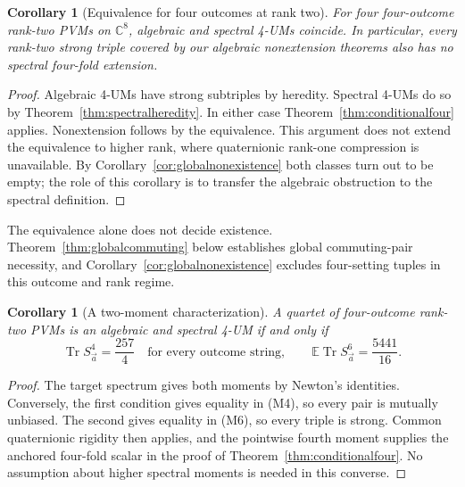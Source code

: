 \documentclass[11pt]{article}
\newtheorem{corollary}[theorem]{Corollary}
\begin{document}
\begin{corollary}[Equivalence for four outcomes at rank two]
\label{cor:unconditionalfour}
For four four-outcome rank-two PVMs on $\mathbb C^8$, algebraic and
spectral 4-UMs coincide. In particular, every rank-two strong triple
covered by our algebraic nonextension theorems also has no spectral
four-fold extension.
\end{corollary}
\begin{proof}
Algebraic 4-UMs have strong subtriples by heredity. Spectral 4-UMs do
so by Theorem~\ref{thm:spectralheredity}. In either case
Theorem~\ref{thm:conditionalfour} applies. Nonextension follows by
the equivalence. This argument does not extend the equivalence to
higher rank, where quaternionic rank-one compression is unavailable.
By Corollary~\ref{cor:globalnonexistence} both classes turn out to be
empty; the role of this corollary is to transfer the algebraic
obstruction to the spectral definition.
\end{proof}

The equivalence alone does not decide existence.
Theorem~\ref{thm:globalcommuting} below establishes global commuting-pair
necessity, and Corollary~\ref{cor:globalnonexistence} excludes four-setting
tuples in this outcome and rank regime.

\begin{corollary}[A two-moment characterization]
\label{cor:twomoment}
A quartet of four-outcome rank-two PVMs is an algebraic and spectral
4-UM if and only if
\[
 \operatorname{Tr}S_{\vec a}^4=\frac{257}{4}
 \quad\text{for every outcome string},\qquad
 \mathbb E\operatorname{Tr}S_{\vec a}^6=\frac{5441}{16}.
\]
\end{corollary}
\begin{proof}
The target spectrum gives both moments by Newton's identities.
Conversely, the first condition gives equality in (M4), so every pair
is mutually unbiased. The second gives equality in (M6), so every
triple is strong. Common quaternionic rigidity then applies, and the
pointwise fourth moment supplies the anchored four-fold scalar in the
proof of Theorem~\ref{thm:conditionalfour}. No assumption about higher
spectral moments is needed in this converse.
\end{proof}
\end{document}
